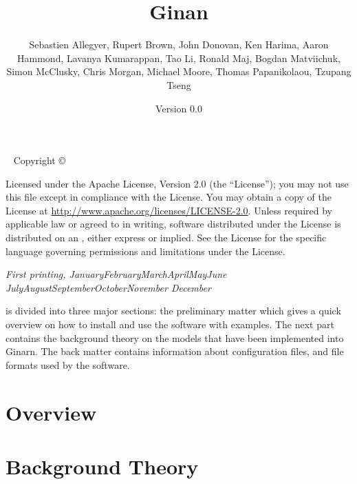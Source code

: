 \documentclass[]{tufte-book}
\title{Ginan}
\date{Version 0.0}
\author[The Ginan team]{
	Sebastien Allegyer,
	Rupert Brown,
	John Donovan,
	Ken Harima,
	Aaron Hammond,
	Lavanya Kumarappan,
	Tao Li,
	Ronald Maj,
	Bogdan Matviichuk,
	Simon McClusky,
	Chris Morgan,
	Michael Moore,
	Thomas Papanikolaou,
	Tzupang Tseng
}
\newcommand{\monthyear}{%
	\ifcase\month\or January\or February\or March\or April\or May\or June\or
	July\or August\or September\or October\or November\or
	December\fi\space\number\year
}
\begin{document}
	
	\frontmatter
	
	\maketitle
	
	
	\newpage
	\begin{fullwidth}
		~\vfill
		\thispagestyle{empty}
		\setlength{\parindent}{0pt}
		\setlength{\parskip}{\baselineskip}
		Copyright \copyright\ \the\year\ \thanklessauthor
		
		\par{}
		
		\par{}
		
		\par Licensed under the Apache License, Version 2.0 (the ``License''); you may not
		use this file except in compliance with the License. You may obtain a copy
		of the License at \url{http://www.apache.org/licenses/LICENSE-2.0}. Unless
		required by applicable law or agreed to in writing, software distributed
		under the License is distributed on an , either express or implied. See the
		License for the specific language governing permissions and limitations
		under the License.
		
		\par\textit{First printing, \monthyear}
	
	 is divided into three major sections: the preliminary matter which gives a quick overview on how to install and use the software with examples. 
	The next part contains the background theory on the models that have been implemented into Ginarn. 
	The back matter contains information about configuration files, and file formats used by the software.
	\listoffigures
	\listoftables
	\cleardoublepage
	\part{Overview}
	
	
	
	
	\mainmatter
	\part{Background Theory}
	
	
	
	
	
	
	\backmatter

\end{fullwidth}
\end{document}

